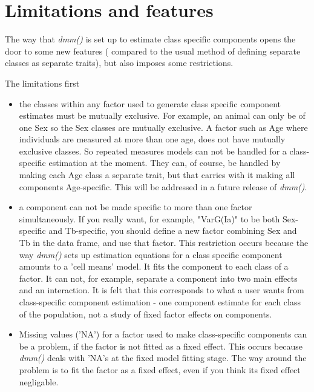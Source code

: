 \documentclass[titlepage]{article}  %
\begin{document}
\section{Limitations and features}
The way that  {\em dmm()} is set up to estimate class specific components opens the door to some new features ( compared to the usual method of defining separate classes as separate traits), but also imposes some restrictions.

The limitations first
\begin{itemize}
\item the classes within any factor used to generate class specific component estimates must be mutually exclusive. For example, an animal can only be of one Sex so the Sex classes are mutually exclusive. A factor such as Age where individuals are measured at more than one age, does not have mutually exclusive classes. So repeated measures models can not be handled for a class-specific estimation at the moment. They can, of course, be handled by making each Age class a separate trait, but that carries with it making all components Age-specific.
This will be addressed in a future release of {\em dmm()}.
\item a component can not be made specific to more than one factor simultaneously. If you really want, for example, "VarG(Ia)" to be both Sex-specific and Tb-specific, you should define a new factor combining Sex and Tb in the data frame, and use that factor. This restriction occurs because the way {\em dmm()} sets up estimation equations for a class specific component amounts to a 'cell means' model. It fits the component to each class of a factor. It can not, for example, separate a component into two main effects and an interaction. It is felt that this corresponds to what a user wants from class-specific component estimation - one component estimate for each class of the population, not a study of fixed factor effects on components.
\item Missing values ('NA') for a factor used to make class-specific components can be a problem, if the factor is not fitted as a fixed effect. This occurs because {\em dmm()} deals with 'NA's at the fixed model fitting stage. The way around the problem is to fit the factor as a fixed effect, even if you think its fixed effect negligable.

\end{itemize}
\end{document}
